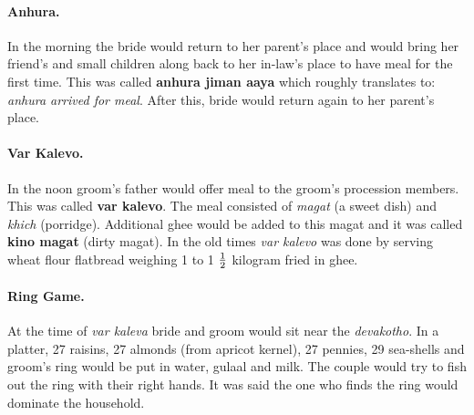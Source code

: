 \paragraph{Anhura.} In the morning the bride would return to her parent's place
and would bring her friend's and small children along back to her in-law's
place to have meal for the first time. This was called \textbf{anhura jiman
aaya} which roughly translates to: \textit{anhura arrived for meal}. After
this, bride would return again to her parent's place.

\paragraph{Var Kalevo.} In the noon groom's father would offer meal to the
groom's procession members. This was called \textbf{var kalevo}. The meal
consisted of \textit{magat} (a sweet dish) and \textit{khich} (porridge).
Additional ghee would be added to this magat and it was called \textbf{kino
magat} (dirty magat). In the old times \textit{var kalevo} was done by
serving wheat flour flatbread weighing 1 to 1 $1\over2$ kilogram fried in
ghee.

\paragraph{Ring Game.} At the time of \textit{var kaleva} bride and groom would
sit near the \textit{devakotho}. In a platter, 27 raisins, 27 almonds (from
apricot kernel), 27 pennies, 29 sea-shells and groom's ring would be
put in water, gulaal and milk. The couple would try to fish out the ring with
their right hands. It was said the one who finds the ring would dominate the
household.

